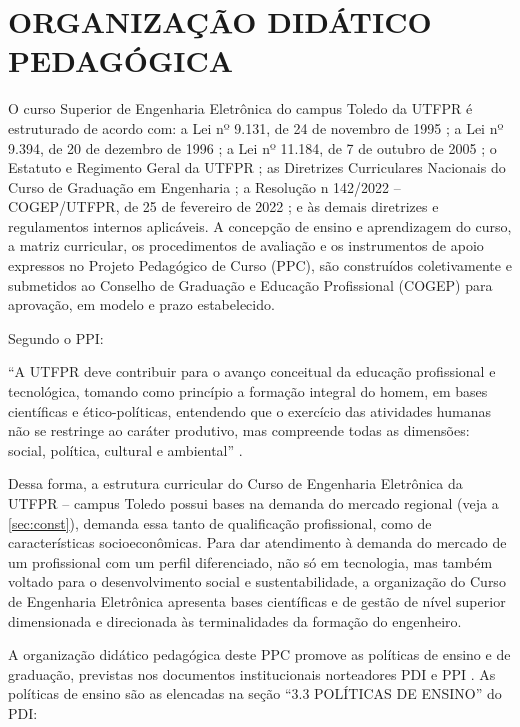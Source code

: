 \chapter{ORGANIZAÇÃO DIDÁTICO PEDAGÓGICA}
\label{chap:matriz}

O curso Superior de Engenharia Eletrônica do campus Toledo da UTFPR  é estruturado de acordo com: a Lei nº 9.131, de 24 de novembro de 1995 \cite{Lei:9131:1995}; a Lei nº 9.394, de 20 de dezembro de 1996 \cite{Lei:9394:1996}; a Lei nº 11.184, de 7 de outubro de 2005 \cite{Lei:11.184:2005}; o Estatuto e Regimento Geral da UTFPR \cite{estatutoutfpr}; as Diretrizes Curriculares Nacionais do Curso de Graduação em Engenharia \cite{dcneng}; a Resolução n\textordmasculine{} 142/2022 – COGEP/UTFPR, de 25 de fevereiro de 2022 \cite{cogep142}; e às demais diretrizes e regulamentos internos aplicáveis. A concepção de ensino e aprendizagem do curso, a matriz curricular, os procedimentos de avaliação e os instrumentos de apoio expressos no Projeto Pedagógico de Curso (PPC), são construídos coletivamente e submetidos ao Conselho de Graduação e Educação Profissional (COGEP) para aprovação, em modelo e prazo estabelecido.

Segundo o PPI:

\begin{citacao}
	``A  UTFPR  deve  contribuir  para  o  avanço  conceitual  da educação profissional e tecnológica, tomando como princípio a formação integral do homem,  em  bases  científicas  e  ético-políticas,  entendendo  que  o  exercício  das atividades humanas não se restringe ao caráter produtivo, mas compreende todas as dimensões: social, política, cultural e ambiental'' \cite{ppiutfpr}.
\end{citacao}

Dessa forma, a estrutura curricular do Curso de Engenharia Eletrônica da UTFPR – campus Toledo possui bases na demanda do mercado regional (veja a \autoref{sec:const}), demanda essa tanto de qualificação profissional, como de características socioeconômicas. Para dar atendimento à demanda do mercado de um profissional com um perfil diferenciado, não só em tecnologia, mas também voltado para o desenvolvimento social e sustentabilidade, a organização do Curso de Engenharia Eletrônica apresenta bases científicas e de gestão de nível superior dimensionada e direcionada às terminalidades da formação do engenheiro.

A organização didático pedagógica deste PPC promove as políticas de ensino e de graduação, previstas nos documentos institucionais norteadores PDI \cite{pdiutfpr} e PPI \cite{ppiutfpr}. As políticas de ensino são as elencadas na seção ``3.3 POLÍTICAS DE ENSINO'' do PDI:

